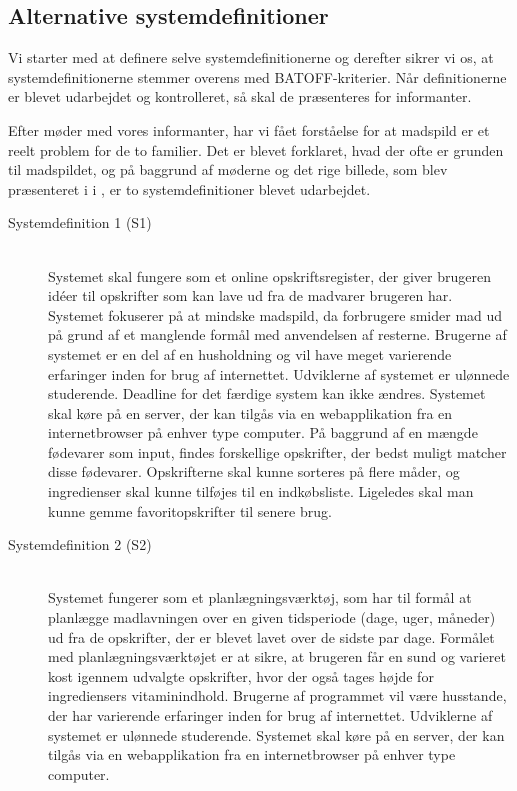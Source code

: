 \subsection{Alternative systemdefinitioner}
\label{subsec:alternativesystemdefinitioner}

Vi starter med at definere selve systemdefinitionerne og derefter sikrer vi os, at systemdefinitionerne stemmer overens med BATOFF-kriterier. Når definitionerne er blevet udarbejdet og kontrolleret, så skal de præsenteres for informanter. 

Efter møder med vores informanter, har vi fået forståelse for at madspild er et reelt problem for de to familier. Det er blevet forklaret, hvad der ofte er grunden til madspildet, og på baggrund af møderne og det rige billede, som blev præsenteret i  i , er to systemdefinitioner blevet udarbejdet.

\begin{description}
\item[Systemdefinition 1 (S1)] \hfill \\
Systemet skal fungere som et online opskriftsregister, der giver brugeren idéer til opskrifter som kan lave ud fra de madvarer brugeren har. Systemet fokuserer på at mindske madspild, da forbrugere smider mad ud på grund af et manglende formål med anvendelsen af resterne. Brugerne af systemet er en del af en husholdning og vil have meget varierende erfaringer inden for brug af internettet. Udviklerne af systemet er ulønnede studerende. Deadline for det færdige system kan ikke ændres. Systemet skal køre på en server, der kan tilgås via en webapplikation fra en internetbrowser på enhver type computer. På baggrund af en mængde fødevarer som input, findes forskellige opskrifter, der bedst muligt matcher disse fødevarer. Opskrifterne skal kunne sorteres på flere måder, og ingredienser skal kunne tilføjes til en indkøbsliste. Ligeledes skal man kunne gemme favoritopskrifter til senere brug.
\item[Systemdefinition 2 (S2)] \hfill \\
Systemet fungerer som et planlægningsværktøj, som har til formål at planlægge madlavningen over en given tidsperiode (\fx dage, uger, måneder) ud fra de opskrifter, der er blevet lavet over de sidste par dage. Formålet med planlægningsværktøjet er at sikre, at brugeren får en sund og varieret kost igennem udvalgte opskrifter, hvor der også tages højde for ingrediensers vitaminindhold. Brugerne af programmet vil være husstande, der har varierende erfaringer inden for brug af internettet. Udviklerne af systemet er ulønnede studerende. Systemet skal køre på en server, der kan tilgås via en webapplikation fra en internetbrowser på enhver type computer.
\end{description}


